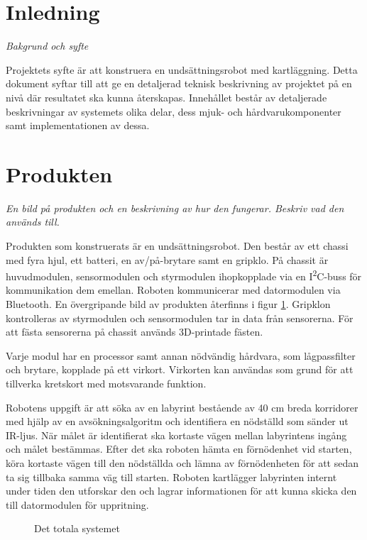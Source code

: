 \documentclass[11pt]{article}
\begin{document}
\begin{flushleft}
\section{Inledning}
\textit{Bakgrund och syfte}

Projektets syfte är att konstruera en undsättningsrobot med kartläggning. Detta dokument syftar till att ge en detaljerad teknisk beskrivning av projektet på en nivå där resultatet ska kunna återskapas. Innehållet består av detaljerade beskrivningar av systemets olika delar, dess mjuk- och hårdvarukomponenter samt implementationen av dessa.

\section{Produkten}
\textit{En bild på produkten och en beskrivning av hur den fungerar. Beskriv vad den används till.}

Produkten som konstruerats är en undsättningsrobot. Den består av ett chassi med fyra hjul, ett batteri, en av/på-brytare samt en gripklo. På chassit är huvudmodulen, sensormodulen och styrmodulen ihopkopplade via en I\textsuperscript{2}C-buss för kommunikation dem emellan. Roboten kommunicerar med datormodulen via Bluetooth\textsuperscript{\circledR}. En övergripande bild av produkten återfinns i figur \ref{overview}. Gripklon kontrolleras av styrmodulen och sensormodulen tar in data från sensorerna. För att fästa sensorerna på chassit används 3D-printade fästen.

Varje modul har en processor samt annan nödvändig hårdvara, som lågpassfilter och brytare, kopplade på ett virkort. Virkorten kan användas som grund för att tillverka kretskort med motsvarande funktion. 

Robotens uppgift är att söka av en labyrint bestående av 40 cm breda korridorer med hjälp av en avsökningsalgoritm och identifiera en nödställd som sänder ut IR-ljus. När målet är identifierat ska kortaste vägen mellan labyrintens ingång och målet bestämmas. Efter det ska roboten hämta en förnödenhet vid starten, köra kortaste vägen till den nödställda och lämna av förnödenheten för att sedan ta sig tillbaka samma väg till starten. Roboten kartlägger labyrinten internt under tiden den utforskar den och lagrar informationen för att kunna skicka den till datormodulen för uppritning. 


\begin{figure}[!htbp]
\centering
\noindent\resizebox{\linewidth}{!}{
	}
	\caption{Det totala systemet \label{overview}}	
\end{figure}


\end{flushleft}
\end{document}
